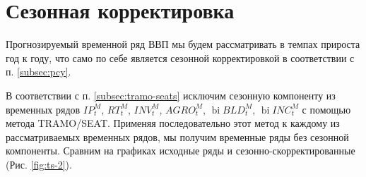 \documentclass[a4paper, 14pt]{extreport}
\numberwithin{equation}{section}
\newcommand{\bi}{\operatorname{bi}}
\numberwithin{equation}{section}
\begin{document}
	\newpage
	\section{Сезонная корректировка}
	Прогнозируемый временной ряд ВВП мы будем рассматривать в темпах прироста год к году, что само по себе является сезонной корректировкой в соответствии с п. \ref{subsec:pcy}. 
	
	В соответствии с п. \ref{subsec:tramo-seats} исключим сезонную компоненту из временных рядов $IP_t^M$, $RT_t^M$, $INV_t^M$, $AGRO_t^M$, $\bi BLD_t^M$,  $\bi INC_t^M$ с помощью метода TRAMO/SEAT.
	Применяя последовательно этот метод к каждому из рассматриваемых временных рядов, мы получим временные ряды без сезонной компоненты. Сравним на графиках исходные ряды и сезонно-скорректированные (Рис. \ref{fig:ts-2}).
	
\end{document}
